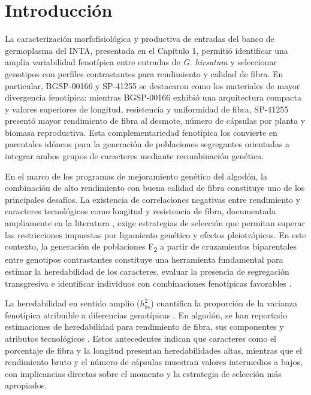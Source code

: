 \documentclass[12pt,oneside]{reedthesis}
\begin{document}
\section{Introducción}\label{introducciuxf3n-1}

La caracterización morfofisiológica y productiva de entradas del banco de germoplasma del INTA, presentada en el Capítulo 1, permitió identificar una amplia variabilidad fenotípica entre entradas de \emph{G. hirsutum} y seleccionar genotipos con perfiles contrastantes para rendimiento y calidad de fibra. En particular, BGSP-00166 y SP-41255 se destacaron como los materiales de mayor divergencia fenotípica: mientras BGSP-00166 exhibió una arquitectura compacta y valores superiores de longitud, resistencia y uniformidad de fibra, SP-41255 presentó mayor rendimiento de fibra al desmote, número de cápsulas por planta y biomasa reproductiva. Esta complementariedad fenotípica los convierte en parentales idóneos para la generación de poblaciones segregantes orientadas a integrar ambos grupos de caracteres mediante recombinación genética.

En el marco de los programas de mejoramiento genético del algodón, la combinación de alto rendimiento con buena calidad de fibra constituye uno de los principales desafíos. La existencia de correlaciones negativas entre rendimiento y caracteres tecnológicos como longitud y resistencia de fibra, documentada ampliamente en la literatura \autocite{meredith1984,mccarty2006,li2023}, exige estrategias de selección que permitan superar las restricciones impuestas por ligamiento genético y efectos pleiotrópicos. En este contexto, la generación de poblaciones F\textsubscript{2} a partir de cruzamientos biparentales entre genotipos contrastantes constituye una herramienta fundamental para estimar la heredabilidad de los caracteres, evaluar la presencia de segregación transgresiva e identificar individuos con combinaciones fenotípicas favorables \autocite{kearsey1996}.

La heredabilidad en sentido amplio (\(h_{bs}^{2}\)) cuantifica la proporción de la varianza fenotípica atribuible a diferencias genotípicas \autocite{kearsey1996}. En algodón, se han reportado estimaciones de heredabilidad para rendimiento de fibra, sus componentes y atributos tecnológicos \autocite{meredith1984,tang1996,ribeiro2017,decarvalho2022,nidagundi2023}. Estos antecedentes indican que caracteres como el porcentaje de fibra y la longitud presentan heredabilidades altas, mientras que el rendimiento bruto y el número de cápsulas muestran valores intermedios a bajos, con implicancias directas sobre el momento y la estrategia de selección más apropiados.
\end{document}
